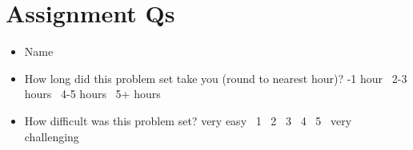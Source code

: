 \section*{Assignment Qs}

\begin{itemize}
\item Name
\item How long did this problem set take you (round to nearest hour)? -1 hour \ 2-3 hours \ 4-5 hours \ 5+ hours
\item How difficult was this problem set? \quad
  very easy \ 1 \ 2 \ 3 \ 4 \ 5 \ very challenging
\end{itemize}
